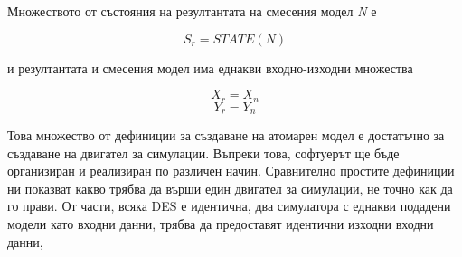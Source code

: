 		\noindent Множеството от състояния на резултантата на смесения модел \emph{N} е
		
		\begin{equation}
			S_r = STATE(N)
		\end{equation}
		
		\noindent и резултантата и смесения модел има еднакви входно-изходни множества
		
		\begin{equation}
			X_r = X_n
		\end{equation}		
		\begin{equation}
			Y_r = Y_n
		\end{equation}
		
		Това множество от дефиниции за създаване на атомарен модел е достатъчно
		за създаване на двигател за симулации. Въпреки това, софтуерът ще бъде
		организиран и реализиран по различен начин. Сравнително простите
		дефиниции ни показват какво трябва да върши един двигател за симулации,
		не точно как да го прави. От части, всяка \ac{DES} е идентична, два
		симулатора с еднакви подадени модели като входни данни, трябва да
		предоставят идентични изходни входни данни,